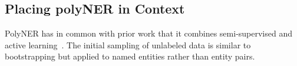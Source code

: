 \subsection{Placing polyNER in Context}
PolyNER has in common with prior work that it combines semi-supervised and active learning~\cite{nguyen2004active,basu2004active}.
The initial sampling of unlabeled data is similar to bootstrapping but applied to named entities rather than entity pairs. 
